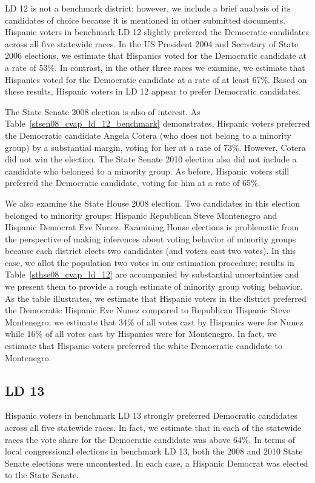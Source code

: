 \documentclass[12pt]{article}
\begin{document}
LD 12 is not a benchmark district; however, we include a brief
analysis of its candidates of choice because it is mentioned in other
submitted documents.  Hispanic voters in benchmark LD 12 slightly
preferred the Democratic candidates across all five statewide races.
In the US President 2004 and Secretary of State 2006 elections, we
estimate that Hispanics voted for the Democratic candidate at a rate
of 53\%.  In contrast, in the other three races we examine, we
estimate that Hispanics voted for the Democratic candidate at a rate
of at least 67\%. Based on these results, Hispanic voters in LD 12
appear to prefer Democratic candidates.

The State Senate 2008 election is also of interest.  As
Table~\ref{stsen08_cvap_ld_12_benchmark} demonstrates, Hispanic voters
preferred the Democratic candidate Angela Cotera (who does not belong to a minority group) by a substantial margin, voting for her at a rate of
73\%. However, Cotera did not win the election. The State Senate 2010
election also did not include a candidate who belonged to a minority group. As before, Hispanic voters still preferred the Democratic candidate,
voting for him at a rate of 65\%.

We also examine the State House 2008 election. Two candidates in this
election belonged to minority groups: Hispanic Republican Steve
Montenegro and Hispanic Democrat Eve Nunez. Examining House elections
is problematic from the perspective of making inferences about voting
behavior of minority groups because each district elects two
candidates (and voters cast two votes). In this case, we allot the
population two votes in our estimation procedure; results in
Table~\ref{sthse08_cvap_ld_12} are accompanied by substantial
uncertainties and we present them to provide a rough estimate of
minority group voting behavior. As the table illustrates, we estimate
that Hispanic voters in the district preferred the Democratic Hispanic
Eve Nunez compared to Republican Hispanic Steve Montenegro; we
estimate that 34\% of all votes cast by Hispanics were for Nunez while
16\% of all votes cast by Hispanics were for Montenegro. In fact, we
estimate that Hispanic voters preferred the white Democratic candidate
to Montenegro.
 
\subsection{LD 13}
Hispanic voters in benchmark LD 13 strongly preferred Democratic
candidates across all five statewide races. In fact, we estimate that
in each of the statewide races the vote share for the Democratic
candidate was above 64\%. In terms of local congressional elections in
benchmark LD 13, both the 2008 and 2010 State Senate elections were
uncontested. In each case, a Hispanic Democrat was elected to the
State Senate.
\end{document}
